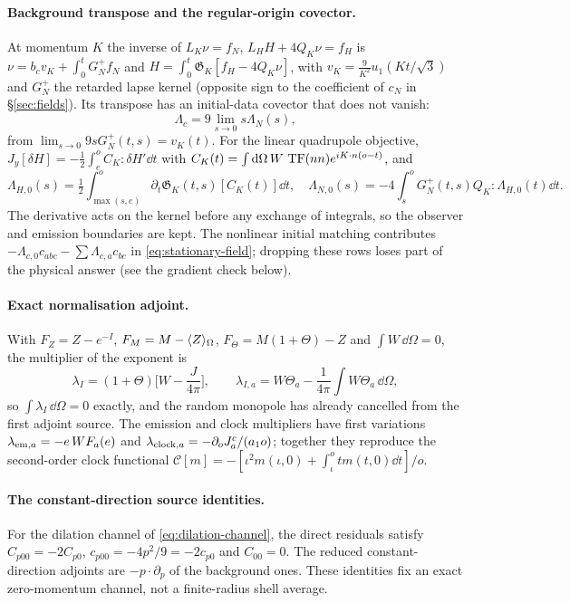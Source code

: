 \paragraph{Background transpose and the regular-origin covector.} At momentum $K$ the inverse
of $L_K\nu=f_N$, $L_HH+4Q_K\nu=f_H$ is $\nu=b_cv_K+\int_0^tG_N^+f_N$ and
$H=\int_0^t\mathfrak G_K[f_H-4Q_K\nu]$, with $v_K=\frac9{K^2}u_1(Kt/\sqrt3)$ and $G_N^+$ the
retarded lapse kernel (opposite sign to the coefficient of $c_N$ in \S\ref{sec:fields}). Its
transpose has an initial-data covector that does not vanish:
\begin{equation}\label{eq:origin-covector}
 \Lambda_c=9\lim_{s\to0}s\Lambda_N(s),
\end{equation}
from $\lim_{s\to0}9sG_N^+(t,s)=v_K(t)$. For the linear quadrupole objective,
$J_y[\delta H]=-\frac12\int_e^oC_K:\delta H'\dd t$ with
$C_K(t)=\int\mathrm{d}\Omega\,W\,\operatorname{TF}(nn)e^{iK\cdot n(o-t)}$, and
\[
 \Lambda_{H,0}(s)=\tfrac12\int_{\max(s,e)}^o\partial_t\mathfrak G_K(t,s)[C_K(t)]\dd t,\quad
 \Lambda_{N,0}(s)=-4\int_s^oG_N^+(t,s)Q_K:\Lambda_{H,0}(t)\dd t .
\]
The derivative acts on the kernel before any exchange of integrals, so the observer and emission
boundaries are kept. The nonlinear initial matching contributes
$-\Lambda_{c,0}c_{abc}-\sum\Lambda_{c,a}c_{bc}$ in \eqref{eq:stationary-field}; dropping these rows
loses part of the physical answer (see the gradient check below).

\paragraph{Exact normalisation adjoint.} With $F_Z=Z-e^{-I}$, $F_M=M-\langle Z\rangle_{\Omega}$,
$F_\Theta=M(1+\Theta)-Z$ and $\int W\,\dd\Omega=0$, the multiplier of the exponent is
\begin{equation}\label{eq:normalisation-adjoint}
 \lambda_I=(1+\Theta)\Big[W-\frac{J}{4\pi}\Big],\qquad
 \lambda_{I,a}=W\Theta_a-\frac1{4\pi}\int W\Theta_a\,\dd\Omega,
\end{equation}
so $\int\lambda_I\,\dd\Omega=0$ exactly, and the random monopole has already cancelled from the
first adjoint source. The emission and clock multipliers have first variations
$\lambda_{{\rm em},a}=-e\,WF_a(e)$ and $\lambda_{{\rm clock},a}=-\partial_oJ^c_a/(a_1o)$; together
they reproduce the second-order clock functional
$\mathcal C[m]=-[\iota^2m(\iota,0)+\int_\iota^otm(t,0)\dd t]/o$.

\paragraph{The constant-direction source identities.}
For the dilation channel of \eqref{eq:dilation-channel}, the direct residuals satisfy
$C_{p00}=-2C_{p0}$, $c_{p00}=-4p^2/9=-2c_{p0}$ and $C_{00}=0$.
The reduced constant-direction adjoints are $-p\cdot\partial_p$ of the background ones.
These identities fix an exact zero-momentum channel, not a finite-radius shell average.

